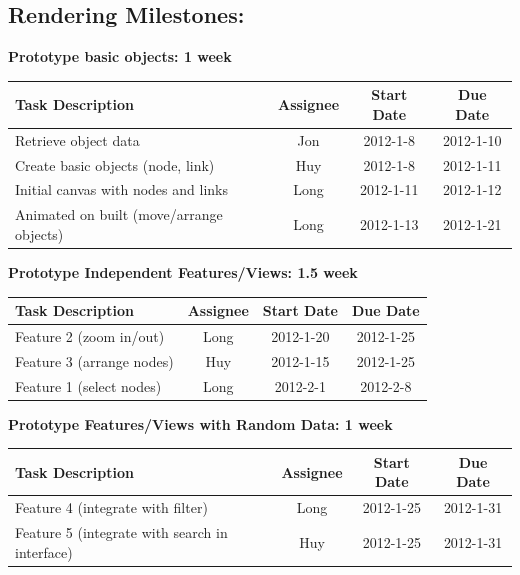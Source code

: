\documentclass[12pt, letterpaper]{article}
\begin{document}
\subsection{Rendering Milestones:}

  \begin{center}
		{\bf Prototype basic objects: 1 week}
    \begin{tabular}{| p{8.3cm} || c | c | c | }
      \hline
      Task Description & Assignee & Start Date & Due Date \\
      \hline
			Retrieve object data & Jon & 2012-1-8 & 2012-1-10 \\
	    Create basic objects (node, link)& Huy & 2012-1-8 & 2012-1-11 \\
			Initial canvas with nodes and links & Long & 2012-1-11 & 2012-1-12 \\
	    Animated on built (move/arrange objects) & Long & 2012-1-13 & 2012-1-21 \\
      \hline
    \end{tabular}
  \end{center}

\begin{center}
		{\bf Prototype Independent Features/Views: 1.5 week}
    \begin{tabular}{| p{8.3cm} || c | c | c | }
      \hline
      Task Description & Assignee & Start Date & Due Date \\
      \hline
	    Feature 2 (zoom in/out)  & Long & 2012-1-20 & 2012-1-25 \\
	    Feature 3 (arrange nodes)  & Huy & 2012-1-15 & 2012-1-25 \\
		Feature 1 (select nodes) & Long & 2012-2-1 & 2012-2-8 \\
      \hline
    \end{tabular}
  \end{center}

\begin{center}
		{\bf Prototype Features/Views with Random Data: 1 week}
    \begin{tabular}{| p{8.3cm} || c | c | c | }
      \hline
      Task Description & Assignee & Start Date & Due Date \\
      \hline
	    Feature 4 (integrate with filter)  & Long & 2012-1-25 & 2012-1-31 \\
            Feature 5 (integrate with search in interface) & Huy & 2012-1-25 & 2012-1-31 \\
      \hline
    \end{tabular}
  \end{center}
\end{document}

